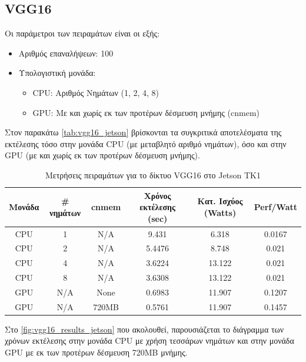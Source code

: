 
\subsection{VGG16}

Οι παράμετροι των πειραμάτων είναι οι εξής:
\begin{itemize}
  \item{Αριθμός επαναλήψεων: 100}
  \item{Υπολογιστική μονάδα:}
    \begin{itemize}
      \item{CPU: Αριθμός Νημάτων (1, 2, 4, 8)}
      \item{GPU: Με και χωρίς εκ των προτέρων δέσμευση μνήμης (cnmem)}
    \end{itemize}
\end{itemize}

Στον παρακάτω \autoref{tab:vgg16_jetson} βρίσκονται τα συγκριτικά αποτελέσματα της
εκτέλεσης τόσο στην μονάδα CPU (με μεταβλητό αριθμό νημάτων), όσο και στην
GPU (με και χωρίς εκ των προτέρων δέσμευση μνήμης).

\begin{table}[H]
  \begin{center}
    \caption{Μετρήσεις πειραμάτων για το δίκτυο VGG16 στο Jetson TK1}
    \label{tab:vgg16_jetson}
    \small
    \begin{tabular}[center]{ | c | c | c | c | c | c | }
      \hline
      \rowcolor{Gray}
      Μονάδα & \# νημάτων & cnmem & Χρόνος εκτέλεσης (sec) & Κατ. Ισχύος (Watts) & Perf/Watt \\
      \hline
      CPU & 1 & N/A & 9.431 & 6.318 & 0.0167\\
      CPU & 2 & N/A & 5.4476 &  8.748 & 0.021\\
      CPU & 4 & N/A & 3.6224 & 13.122 & 0.021\\
      CPU & 8 & N/A & 3.6308 & 13.122 & 0.021\\
      GPU & N/A & None & 0.6983 & 11.907 & 0.1207\\
      GPU & N/A & 720MB & 0.5761 & 11.907 & 0.1457\\
      \hline
    \end{tabular}
  \end{center}
\end{table}

Στο \autoref{fig:vgg16_results_jetson} που ακολουθεί, παρουσιάζεται το διάγραμμα
των χρόνων εκτέλεσης στην μονάδα CPU με χρήση τεσσάρων νημάτων και στην μονάδα
GPU με εκ των προτέρων δέσμευση 720MB μνήμης.

